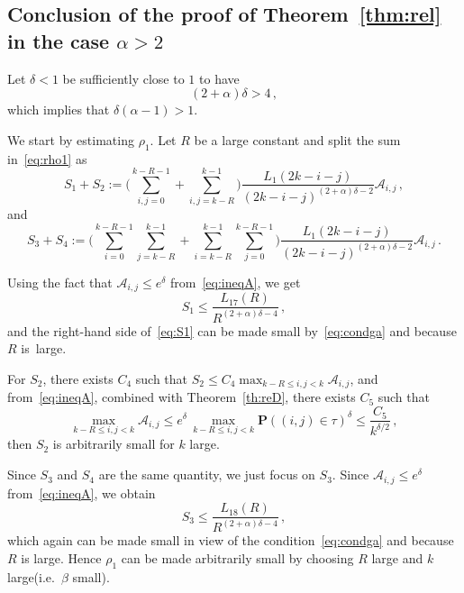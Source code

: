 \documentclass[AHL,Unicode,longabstracts]{cedram}
\newcommand{\ga}{\alpha}
\newcommand{\gb}{\beta}
\newcommand{\gd}{\delta}
\newcommand{\cA}{\ensuremath{\mathcal{A}}}
\newcommand{\bP}{\ensuremath{\mathbf{P}}}
\begin{document}
\subsection{Conclusion of the proof of Theorem~\ref{thm:rel} in the case \texorpdfstring{$\ga > 2$}{ga > 2}}\label{sec:ga2}


Let $\delta < 1$ be sufficiently close to $1$ to have
\begin{equation}\label{eq:condga}
(2+\ga) \delta > 4\,,
\end{equation}
which implies that $\gd(\ga-1) >1$.


We start by estimating $\rho_1$. Let $R$ be a large constant and split the sum in~\eqref{eq:rho1} as
\begin{equation}
S_1+ S_2 :=\bigg(\sum_{i,j=0}^{k-R-1} + \sum_{i,j=k-R}^{k-1} \bigg) \frac{L_1(2k -i -j)}{(2k -i-j)^{(2+\ga) \delta - 2}} \cA_{i,j}\,,
\end{equation}
and
\begin{equation}
S_3+S_4 := \bigg(\sum_{i=0}^{k-R-1} \sum_{j=k-R}^{k-1} + \sum_{i=k-R}^{k-1} \sum_{j=0}^{k-R-1} \bigg) \frac{L_1(2k -i -j)}{(2k -i-j)^{(2+\ga) \delta - 2}} \cA_{i,j}\,.
\end{equation}


Using the fact that $\cA_{i,j} \le e^\delta$ from~\eqref{eq:ineqA}, we get
\begin{equation}\label{eq:S1}
S_1 \le \frac{L_{17}(R)}{R^{(2+\ga) \delta-4}}\,,
\end{equation}
and the right-hand side of~\eqref{eq:S1} can be made small by~\eqref{eq:condga} and because $R$ is~large.

For $S_2$, there exists $C_4$ such that $S_2 \le C_4 \max_{k - R \le i,j < k} \cA_{i,j} $, and from~\eqref{eq:ineqA}, combined with Theorem~\ref{th:reD}, there exists $C_5$ such that
\begin{equation}
\max_{k - R \le i,j < k} \cA_{i,j} \le e^{\delta}\,\max_{k - R \le i,j < k} \bP((i,j) \in \tau) ^\delta \le \frac{C_5}{k^{\delta/2}}\,,
\end{equation}
then $S_2$ is arbitrarily small for $k$ large.

Since $S_3$ and $S_4$ are the same quantity, we just focus on $S_3$. Since $\cA_{i,j} \le e^ \delta$ from~\eqref{eq:ineqA}, we obtain
\begin{equation}
S_3 \le \frac{L_{18}(R)}{R^{(2+\ga) \delta-4}}\,,
\end{equation}
which again can be made small in view of the condition~\eqref{eq:condga} and because $R$ is large. Hence $\rho_1$ can be made arbitrarily small by choosing $R$ large and $k$ large\linebreak(i.e.~$\gb$ small).
\end{document}
